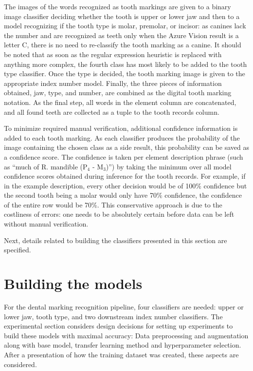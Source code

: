\documentclass[english,twoside,openright]{UH_DS_MSc}
\begin{document}
The images of the words recognized as tooth markings are given to a binary image classifier deciding whether the tooth 
is upper or lower jaw and then to a model recognizing if the tooth type is molar, premolar, or incisor: as 
canines lack the number and are recognized as teeth only when the Azure Vision result is a letter C, there is 
no need to re-classify the tooth marking as a canine. It should be noted that as soon as the regular expression
heuristic is replaced with anything more complex, the fourth class has most likely to be added to the tooth type classifier.
Once the type is decided, the tooth marking image is given to the appropriate index number model. Finally, 
the three pieces of information obtained, jaw, type, and number, are combined as the digital tooth marking 
notation. As the final step, all words in the element column are concatenated, and all found teeth are 
collected as a tuple to the tooth records column.

To minimize required manual verification, additional confidence information is added 
to each tooth marking. As each classifier produces the probability of the image containing the 
chosen class as a side result, this probability can be saved as a confidence score. The confidence is taken 
per element description phrase (such as ``much of R. mandible ($\text{P}_4$ - $\text{M}_3$)'') by taking the minimum over all 
model confidence scores obtained during inference for the tooth records. For example, if in the 
example description, every other decision would be of 100\% confidence but the second tooth being a molar 
would only have 70\% confidence, the confidence of the entire row would be 70\%. This conservative approach is 
due to the costliness of errors: one needs to be absolutely certain before data can be left without manual 
verification.

Next, details related to building the classifiers presented in this section are specified.

\section{Building the models}
\label{sect:building-models}

For the dental marking recognition pipeline, four classifiers are needed: upper or lower jaw, 
tooth type, and two downstream index number classifiers. The experimental 
section considers design decisions for setting up experiments to build these models with maximal accuracy:
 Data preprocessing and augmentation along with base model,
transfer learning method and hyperparameter selection. After a presentation of how the training dataset was created, these aspects are considered.
\end{document}
